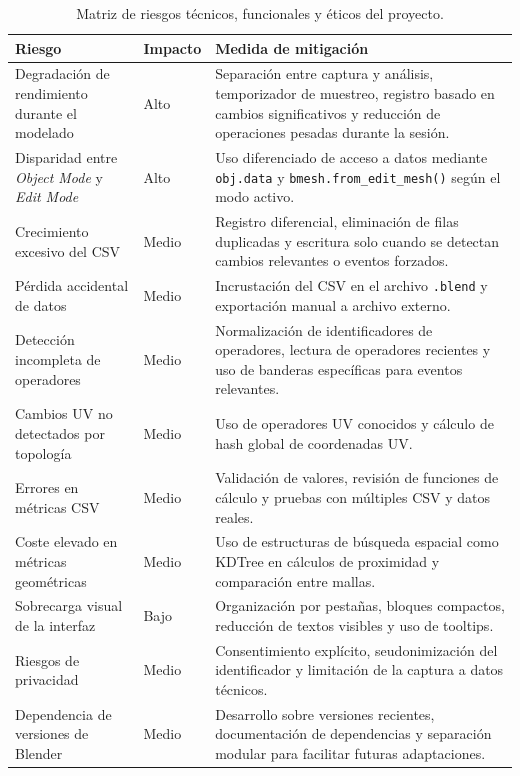 \begin{table}[H]
\centering
\scriptsize
\renewcommand{\arraystretch}{1.2}
\begin{tabularx}{\textwidth}{p{3.4cm}p{1.6cm}X}
\toprule
\textbf{Riesgo} & \textbf{Impacto} & \textbf{Medida de mitigación} \\
\midrule
Degradación de rendimiento durante el modelado & Alto & Separación entre captura y análisis, temporizador de muestreo, registro basado en cambios significativos y reducción de operaciones pesadas durante la sesión. \\
Disparidad entre \textit{Object Mode} y \textit{Edit Mode} & Alto & Uso diferenciado de acceso a datos mediante \texttt{obj.data} y \texttt{bmesh.from\_edit\_mesh()} según el modo activo. \\
Crecimiento excesivo del CSV & Medio & Registro diferencial, eliminación de filas duplicadas y escritura solo cuando se detectan cambios relevantes o eventos forzados. \\
Pérdida accidental de datos & Medio & Incrustación del CSV en el archivo \texttt{.blend} y exportación manual a archivo externo. \\
Detección incompleta de operadores & Medio & Normalización de identificadores de operadores, lectura de operadores recientes y uso de banderas específicas para eventos relevantes. \\
Cambios UV no detectados por topología & Medio & Uso de operadores UV conocidos y cálculo de hash global de coordenadas UV. \\
Errores en métricas CSV & Medio & Validación de valores, revisión de funciones de cálculo y pruebas con múltiples CSV y datos reales. \\
Coste elevado en métricas geométricas & Medio & Uso de estructuras de búsqueda espacial como KDTree en cálculos de proximidad y comparación entre mallas. \\
Sobrecarga visual de la interfaz & Bajo & Organización por pestañas, bloques compactos, reducción de textos visibles y uso de tooltips. \\
Riesgos de privacidad & Medio & Consentimiento explícito, seudonimización del identificador y limitación de la captura a datos técnicos. \\
Dependencia de versiones de Blender & Medio & Desarrollo sobre versiones recientes, documentación de dependencias y separación modular para facilitar futuras adaptaciones. \\
\bottomrule
\end{tabularx}
\caption{Matriz de riesgos técnicos, funcionales y éticos del proyecto.}
\label{tab:riesgos}
\end{table}

